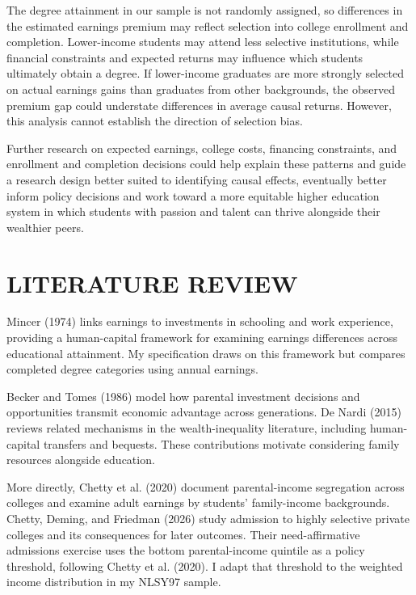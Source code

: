 \documentclass[12pt,letterpaper]{article}
\begin{document}
The degree attainment in our sample is not randomly assigned, so differences in the 
estimated earnings premium may reflect selection into college enrollment and completion. 
Lower-income students may attend less selective institutions, while financial constraints 
and expected returns may influence which students ultimately obtain a degree. 
If lower-income graduates are more strongly selected on actual earnings gains than graduates 
from other backgrounds, the observed premium gap could understate differences in average 
causal returns. However, this analysis cannot establish the direction of selection bias. \newline

Further research on expected earnings, college costs, financing constraints, 
and enrollment and completion decisions could help explain these patterns and guide a 
research design better suited to identifying causal effects, eventually better inform
policy decisions and work toward a more equitable higher education system in which students
with passion and talent can thrive alongside their wealthier peers.

\section*{LITERATURE REVIEW}

Mincer (1974) links earnings to investments in schooling and work experience,
providing a human-capital framework for examining earnings differences across
educational attainment. My specification draws on this framework but compares
completed degree categories using annual earnings. \newline

Becker and Tomes (1986) model how parental investment decisions and opportunities
transmit economic advantage across generations. De Nardi (2015) reviews related
mechanisms in the wealth-inequality literature, including human-capital transfers
and bequests. These contributions motivate considering family resources alongside
education. \newline

More directly, Chetty et al. (2020) document parental-income segregation across
colleges and examine adult earnings by students' family-income backgrounds.
Chetty, Deming, and Friedman (2026) study admission to highly selective private
colleges and its consequences for later outcomes. Their need-affirmative admissions
exercise uses the bottom parental-income quintile as a policy threshold, following
Chetty et al. (2020). I adapt that threshold to the weighted income distribution in
my NLSY97 sample. \newline
\end{document}
